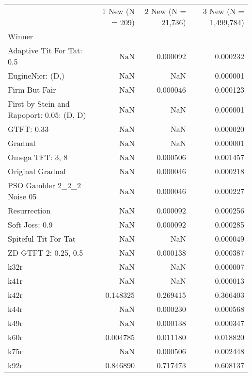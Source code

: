 \begin{tabular}{lrrr}
\toprule
 & 1 New (N =  209) & 2 New (N =  21,736) & 3 New (N =  1,499,784) \\
Winner &  &  &  \\
\midrule
Adaptive Tit For Tat: 0.5 & NaN & 0.000092 & 0.000232 \\
EugineNier: (D,) & NaN & NaN & 0.000001 \\
Firm But Fair & NaN & 0.000046 & 0.000123 \\
First by Stein and Rapoport: 0.05: (D, D) & NaN & NaN & 0.000001 \\
GTFT: 0.33 & NaN & NaN & 0.000020 \\
Gradual & NaN & NaN & 0.000001 \\
Omega TFT: 3, 8 & NaN & 0.000506 & 0.001457 \\
Original Gradual & NaN & 0.000046 & 0.000218 \\
PSO Gambler 2\_2\_2 Noise 05 & NaN & 0.000046 & 0.000227 \\
Resurrection & NaN & 0.000092 & 0.000256 \\
Soft Joss: 0.9 & NaN & 0.000092 & 0.000285 \\
Spiteful Tit For Tat & NaN & NaN & 0.000049 \\
ZD-GTFT-2: 0.25, 0.5 & NaN & 0.000138 & 0.000387 \\
k32r & NaN & NaN & 0.000007 \\
k41r & NaN & NaN & 0.000013 \\
k42r & 0.148325 & 0.269415 & 0.366403 \\
k44r & NaN & 0.000230 & 0.000568 \\
k49r & NaN & 0.000138 & 0.000347 \\
k60r & 0.004785 & 0.011180 & 0.018820 \\
k75r & NaN & 0.000506 & 0.002448 \\
k92r & 0.846890 & 0.717473 & 0.608137 \\
\bottomrule
\end{tabular}
